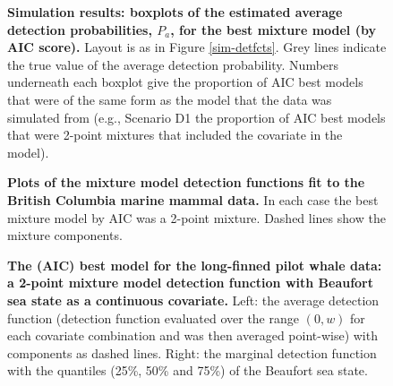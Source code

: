 \documentclass[10pt]{article}
\begin{document}
\begin{figure}[!ht]
\centering
\caption{
{\bf Simulation results: boxplots of the estimated average detection probabilities, $P_a$, for the best mixture model (by AIC score).} Layout is as in Figure \ref{sim-detfcts}. Grey lines indicate the true value of the average detection probability. Numbers underneath each boxplot give the proportion of AIC best models that were of the same form as the model that the data was simulated from (e.g., Scenario D1 the proportion of AIC best models that were 2-point mixtures that included the covariate in the model).
}
\label{sim-boxplots}
\end{figure}

\begin{figure}[!ht]
\centering
\caption{
{\bf Plots of the mixture model detection functions fit to the British Columbia marine mammal data.} In each case the best mixture model by AIC was a 2-point mixture. Dashed lines show the mixture components.
}
\label{williams-detfcts}
\end{figure}

\begin{figure}[!ht]
\centering
\caption{
{\bf The (AIC) best model for the long-finned pilot whale data: a 2-point mixture model detection function with Beaufort sea state as a continuous covariate.} Left: the average detection function (detection function evaluated over the range $(0,w)$ for each covariate combination and was then averaged point-wise) with components as dashed lines. Right: the marginal detection function with the quantiles (25\%, 50\% and 75\%) of the Beaufort sea state.
}
\label{danpike-detfct}
\end{figure}
\end{document}
